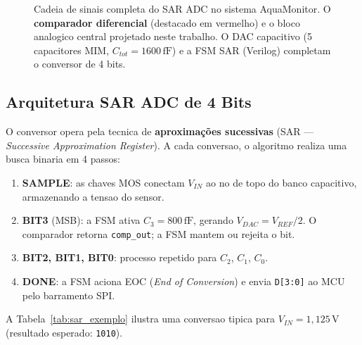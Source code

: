 \documentclass[12pt, a4paper]{article}
\begin{document}
\begin{figure}[H]
\caption{Cadeia de sinais completa do SAR ADC no sistema AquaMonitor. O
         \textbf{comparador diferencial} (destacado em vermelho) e o bloco
         analogico central projetado neste trabalho. O DAC capacitivo
         (5 capacitores MIM, $C_{tot}=1600\,\text{fF}$) e a FSM SAR (Verilog)
         completam o conversor de 4 bits.}
\label{fig:sistema_completo}
\end{figure}

\subsection{Arquitetura SAR ADC de 4 Bits}

O conversor opera pela tecnica de \textbf{aproximações sucessivas} (SAR ---
\textit{Successive Approximation Register}). A cada conversao, o algoritmo
realiza uma busca binaria em 4 passos:

\begin{enumerate}[noitemsep]
  \item \textbf{SAMPLE}: as chaves MOS conectam $V_{IN}$ ao no de topo do banco
        capacitivo, armazenando a tensao do sensor.
  \item \textbf{BIT3} (MSB): a FSM ativa $C_3 = 800\,\text{fF}$, gerando
        $V_{DAC} = V_{REF}/2$. O comparador retorna
        \texttt{comp\_out}; a FSM mantem ou rejeita o bit.
  \item \textbf{BIT2, BIT1, BIT0}: processo repetido para $C_2$, $C_1$, $C_0$.
  \item \textbf{DONE}: a FSM aciona EOC (\textit{End of Conversion}) e envia
        \texttt{D[3:0]} ao MCU pelo barramento SPI.
\end{enumerate}

A Tabela~\ref{tab:sar_exemplo} ilustra uma conversao tipica para
$V_{IN} = 1{,}125\,\text{V}$ (resultado esperado: \texttt{1010}).
\end{document}
